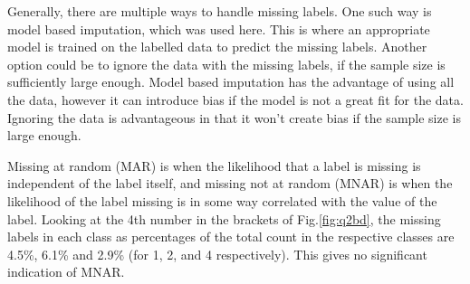    Generally, there are multiple ways to handle missing labels.
    One such way is model based imputation, which was used here.
    This is where an appropriate model is trained on the labelled data to predict the missing labels.
    Another option could be to ignore the data with the missing labels, if the sample size is sufficiently large enough.
    Model based imputation has the advantage of using all the data, however it can introduce bias if the model is not
    a great fit for the data.
    Ignoring the data is advantageous in that it won't create bias if the sample size is large enough.

    Missing at random (MAR) is when the likelihood that a label is missing is independent of the label itself, and
    missing not at random (MNAR) is when the likelihood of the label missing is in some way correlated with the value
    of the label.
    Looking at the 4th number in the brackets of Fig.\eqref{fig:q2bd}, the missing labels in each class as percentages
    of the total count in the respective classes are 4.5\%, 6.1\% and 2.9\% (for 1, 2, and 4 respectively).
    This gives no significant indication of MNAR.
